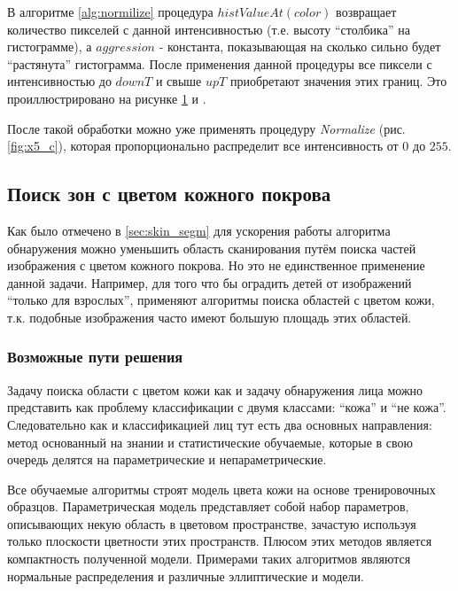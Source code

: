 \documentclass[12pt]{report}
\begin{document}
В алгоритме \ref{alg:normilize} процедура $histValueAt(color)$ возвращает количество пикселей с данной интенсивностью (т.е. высоту 
``столбика'' 
на гистограмме), а $aggression$ - константа, показывающая на сколько сильно будет ``растянута'' гистограмма. После 
применения данной процедуры все пиксели с интенсивностью до $downT$ и свыше $upT$ приобретают значения этих границ. 
Это проиллюстрировано на рисунке \ref{fig:aggresive_normal_steps}  и .


\begin{figure}[h]
	\centering
	\caption{}
	\label{fig:aggresive_normal_steps}
\end{figure}

После такой обработки можно уже применять процедуру \textit{Normalize} (рис. \ref{fig:x5_c}), которая 
пропорционально 
распределит все интенсивность от $0$ до $255$.

\subsection{Поиск зон с цветом кожного покрова}
\label{sec:skin_detection}
Как было отмечено в \ref{sec:skin_segm} для ускорения работы алгоритма обнаружения можно уменьшить область 
сканирования путём поиска частей изображения с цветом кожного покрова. Но это не единственное применение данной задачи. Например, 
для того что бы оградить детей от изображений ``только для взрослых'', применяют алгоритмы поиска областей с цветом 
кожи, т.к. подобные изображения часто имеют большую площадь этих областей. \citep{forsyth1999automatic} \citep
{zheng2004blocking}

\subsubsection{Возможные пути решения}
Задачу поиска области с цветом кожи как и задачу обнаружения лица можно представить как проблему классификации с 
двумя классами: ``кожа'' и ``не кожа''. Следовательно как и классификацией лиц тут есть два основных направления: 
метод основанный на знании и статистические обучаемые, которые в свою очередь делятся на параметрические и 
непараметрические. \citep{vezhnevets2003survey}

Все обучаемые алгоритмы строят модель цвета кожи на основе тренировочных образцов. Параметрическая модель 
представляет собой набор параметров, описывающих некую область в цветовом пространстве, зачастую используя только 
плоскости цветности этих пространств. Плюсом этих методов является компактность полученной модели. Примерами таких 
алгоритмов являются нормальные распределения и различные эллиптические и модели.
\end{document}
